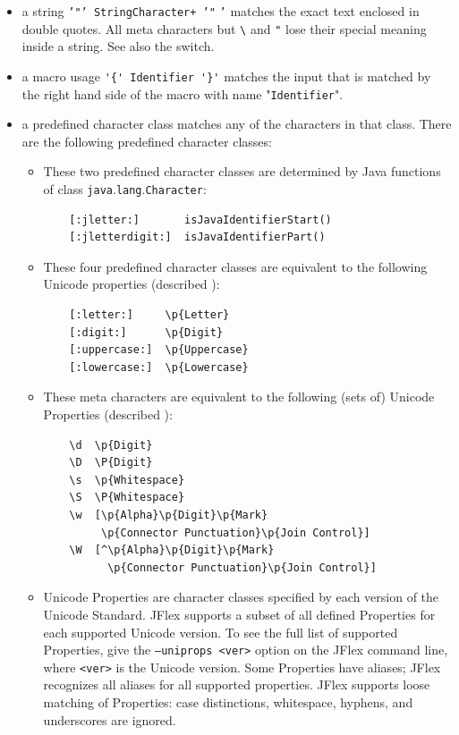\documentclass[11pt]{scrartcl}
\begin{document}
\begin{itemize}
\item
  a string \texttt{'"' StringCharacter+ '"} \texttt{'} matches the exact
  text enclosed in double quotes. All meta characters but \verb+\+ and
  \texttt{"} lose their special meaning inside a string. See also the
   switch.
    
\item
  a macro usage \verb+'{' Identifier '}'+ matches the input that is matched
  by the right hand side of the macro with name "\texttt{Identifier}".

\label{predefCharCl}
\item 
  a predefined character class matches any of
  the characters in that class. There are the following predefined character
  classes:

  \begin{itemize}
  \item
    These two predefined character classes are determined by Java functions of
    class \texttt{java}.\texttt{lang}.\texttt{Cha\-rac\-ter}:

    \begin{verbatim}
    [:jletter:]       isJavaIdentifierStart()
    [:jletterdigit:]  isJavaIdentifierPart()
    \end{verbatim}

  \item
    These four predefined character classes are equivalent to the following
    Unicode properties (described ):

    \begin{verbatim}
    [:letter:]     \p{Letter}
    [:digit:]      \p{Digit}
    [:uppercase:]  \p{Uppercase}
    [:lowercase:]  \p{Lowercase}
    \end{verbatim}

  \item
    These meta characters are equivalent to the following (sets of) Unicode
    Properties (described ):
    
    \begin{verbatim}
    \d  \p{Digit}
    \D  \P{Digit}
    \s  \p{Whitespace}
    \S  \P{Whitespace}
    \w  [\p{Alpha}\p{Digit}\p{Mark}
         \p{Connector Punctuation}\p{Join Control}]
    \W  [^\p{Alpha}\p{Digit}\p{Mark}
          \p{Connector Punctuation}\p{Join Control}]
    \end{verbatim}
    
  \label{unipropsyntax}
  \item
    Unicode Properties are character classes specified by each version of the
    Unicode Standard. JFlex supports a subset of all defined Properties for
    each supported Unicode version. To see the full list of supported
    Properties, give the \texttt{--uniprops <ver>} option on the JFlex
    command line, where \texttt{<ver>} is the Unicode version. Some
    Properties have aliases; JFlex recognizes all aliases for all supported
    properties. JFlex supports loose matching of Properties: case
    distinctions, whitespace, hyphens, and underscores are ignored.


\end{itemize}
\end{itemize}
\end{document}
